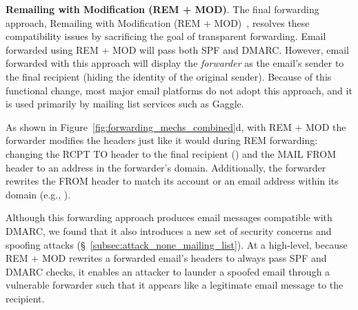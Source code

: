 
\textbf{Remailing with Modification (REM + MOD)}.
The final forwarding approach, Remailing with Modification (REM + MOD)~\cite{rfc6783},
resolves these compatibility issues by sacrificing the goal of transparent forwarding.
Email forwarded using REM + MOD will pass both SPF and DMARC.
However, email forwarded with this approach will display the \textit{forwarder} as the email's sender to the final recipient (hiding the identity of the original sender).
Because of this functional change, most major email platforms do not adopt this approach, and it is used primarily by mailing list services such as Gaggle.

As shown in Figure~\ref{fig:forwarding_mechs_combined}d, with REM + MOD the forwarder modifies the headers just like it would during REM forwarding: changing the \textsc{RCPT TO} header to the final recipient () and the \textsc{MAIL FROM} header to an address in the forwarder's domain.
Additionally, the forwarder rewrites the \textsc{FROM} header to match its account or an email address within its domain (e.g., ).

Although this forwarding approach produces email messages compatible with DMARC,
we found that it also introduces a new set of security concerns and spoofing attacks (\S~\ref{subsec:attack_none_mailing_list}).
At a high-level, because REM + MOD rewrites a forwarded email's headers to always pass SPF and DMARC checks, it enables an attacker to launder a spoofed email through a vulnerable forwarder such that it appears like a legitimate email message to the recipient.

%
%
%
%

